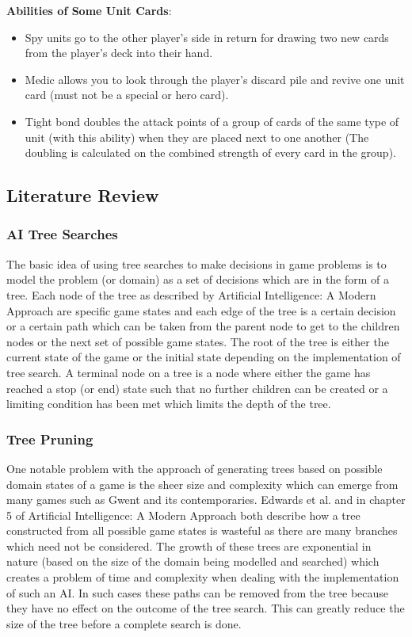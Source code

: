 \documentclass[journal]{IEEEtran}
\begin{document}
  \noindent \textbf{Abilities of Some Unit Cards}:
  \begin{itemize}
    \item Spy units go to the other player’s side in return for drawing two new cards from the player's deck into their hand.
    \item Medic allows you to look through the player's discard pile and revive one unit card (must not be a special or hero card).
    \item Tight bond doubles the attack points of a group of cards of the same type of unit (with this ability) when they are placed next to one another (The doubling is calculated on the combined strength of every card in the group).
  \end{itemize}
  
  \subsection{Literature Review}
  \subsubsection{AI Tree Searches}
  The basic idea of using tree searches to make decisions in game problems is to model the problem (or domain) as a set of decisions which are in the form of a tree. Each node of the tree as described by Artificial Intelligence: A Modern Approach \cite{AIModern} are specific game states and each edge of the tree is a certain decision or a certain path which can be taken from the parent node to get to the children nodes or the next set of possible game states. The root of the tree is either the current state of the game or the initial state depending on the implementation of tree search. A terminal node on a tree is a node where either the game has reached a stop (or end) state such that no further children can be created or a limiting condition has been met which limits the depth of the tree.\\
  
  \subsubsection{Tree Pruning}
  One notable problem with the approach of generating trees based on possible domain states of a game is the sheer size and complexity which can emerge from many games such as Gwent and its contemporaries. Edwards et al. \cite{AIM030} and in chapter 5 of Artificial Intelligence: A Modern Approach \cite{AIModern} both describe how a tree constructed from all possible game states is wasteful as there are many branches which need not be considered. The growth of these trees are exponential in nature (based on the size of the domain being modelled and searched) which creates a problem of time and complexity when dealing with the implementation of such an AI. In such cases these paths can be removed from the tree because they have no effect on the outcome of the tree search. This can greatly reduce the size of the tree before a complete search is done. \\
  
\end{document}
